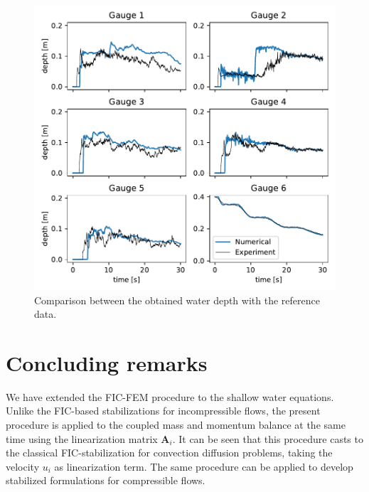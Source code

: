 \documentclass[a4paper,12pt]{article}
\newcommand\Ignasi[1]{\ifthenelse{\boolean{show_comments}}{\textcolor{blue}{#1}}{}}
\newcommand\Miguel[1]{\ifthenelse{\boolean{show_comments}}{\textcolor{red}{#1}}{}}
\begin{document}
\begin{figure}
\centering
\includegraphics[width=\textwidth]{img/exp/gauges.pdf}
\caption{Comparison between the obtained water depth with the reference data.}
\label{experiment_gauges}
\end{figure}



\section{Concluding remarks} \label{sec:conclusions}

We have extended the FIC-FEM procedure to the shallow water equations. Unlike the FIC-based stabilizations for incompressible flows, the present procedure is applied to the coupled mass and momentum balance at the same time using the linearization matrix $\mathbf{A}_i$. It can be seen that this procedure casts to the classical FIC-stabilization for convection diffusion problems, taking the velocity $u_i$ as linearization term. The same procedure can be applied to develop stabilized formulations for compressible flows.
\end{document}
